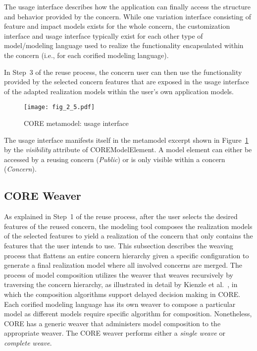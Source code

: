 The usage interface describes how the application can finally access the structure and behavior provided by the concern. While one variation interface consisting of feature and impact models exists for the whole concern, the customization interface and usage interface typically exist for each other type of model/modeling language used to realize the functionality encapsulated within the concern (i.e., for each corified modeling language).

In Step~3 of the reuse process, the concern user can then use the functionality provided by the selected concern features that are exposed in the usage interface of the adapted realization models within the user's own application models.

\begin{figure}
	\centering
	\texttt{[image: fig\_2\_5.pdf]}
	\caption{CORE metamodel: usage interface}
	\label{fig:2.5}
\end{figure}

The usage interface manifests itself in the metamodel excerpt shown in Figure~\ref{fig:2.5} by the \emph{visibility} attribute of {\cls COREModelElement}. A model element can either be accessed by a reusing concern (\emph{Public}) or is only visible within a concern (\emph{Concern}).

\subsection{CORE Weaver}

As explained in Step~1 of the reuse process, after the user selects the desired features of the reused concern, the modeling tool composes the realization models of the selected features to yield a realization of the concern that only contains the features that the user intends to use. This subsection describes the weaving process that flattens an entire concern hierarchy given a specific configuration to generate a final realization model where all involved concerns are merged. The process of model composition utilizes the weaver that weaves recursively by traversing the concern hierarchy, as illustrated in detail by Kienzle et al.~\cite{kienzle2016delaying}, in which the composition algorithms support delayed decision making in CORE. Each corified modeling language has its own weaver to compose a particular model as different models require specific algorithm for composition. Nonetheless, CORE has a generic weaver that administers model composition to the appropriate weaver. The CORE weaver performs either a \emph{single weave} or \emph{complete weave}.

